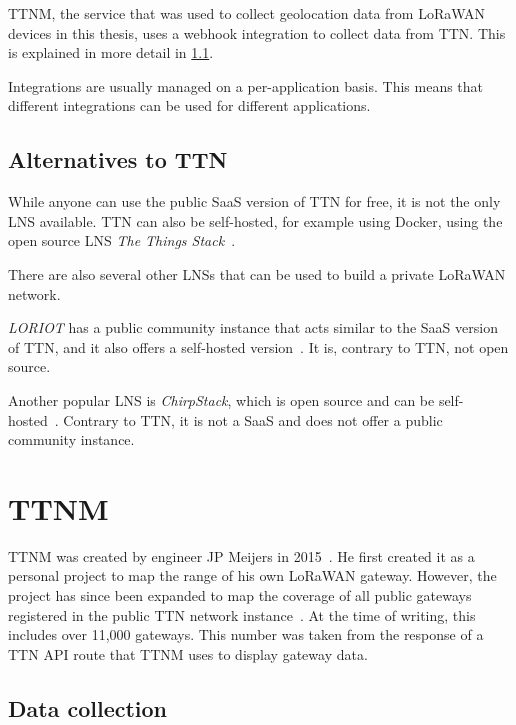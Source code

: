 \ac{TTNM}, the service that was used to collect geolocation data from \ac{LoRaWAN} devices in this thesis, uses a webhook integration to collect data from \ac{TTN}.
This is explained in more detail in \cref{sec:ttm-data-collection}.

Integrations are usually managed on a per-application basis.
This means that different integrations can be used for different applications.

\subsection{Alternatives to \acf{TTN}}

While anyone can use the public \ac{SaaS} version of \ac{TTN} for free, it is not the only \ac{LNS} available.
\ac{TTN} can also be self-hosted, for example using Docker, using the open source \ac{LNS} \emph{The Things Stack}~\cite{the_things_network_host_2023}.

There are also several other \acp{LNS} that can be used to build a private \ac{LoRaWAN} network.

\emph{LORIOT} has a public community instance that acts similar to the \ac{SaaS} version of \ac{TTN}, and it also offers a self-hosted version~\cite{loriot_ag_loriot_2023}.
It is, contrary to \ac{TTN}, not open source.

Another popular \ac{LNS} is \emph{ChirpStack}, which is open source and can be self-hosted~\cite{chirpstack_chirpstack_2023}.
Contrary to \ac{TTN}, it is not a \ac{SaaS} and does not offer a public community instance.

\section{\acf{TTNM}}

\acf{TTNM} was created by engineer JP Meijers in 2015~\cite{linkedin_23_nodate}.
He first created it as a personal project to map the range of his own \ac{LoRaWAN} gateway.
However, the project has since been expanded to map the coverage of all public gateways registered in the public \ac{TTN} network instance~\cite{the_things_network_jp_2018}.
At the time of writing, this includes over 11,000 gateways.
This number was taken from the response of a \ac{TTN} \ac{API} route that \ac{TTNM} uses to display gateway data.

\subsection{Data collection}\label{sec:ttm-data-collection}

